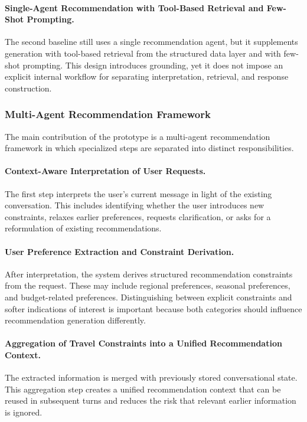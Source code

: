 \paragraph{Single-Agent Recommendation with Tool-Based Retrieval and Few-Shot Prompting.}
The second baseline still uses a single recommendation agent, but it supplements generation with tool-based retrieval from the structured data layer and with few-shot prompting. This design introduces grounding, yet it does not impose an explicit internal workflow for separating interpretation, retrieval, and response construction.

\subsubsection{Multi-Agent Recommendation Framework}\label{subsubsection:system-architecture:multi-agent-framework}
The main contribution of the prototype is a multi-agent recommendation framework in which specialized steps are separated into distinct responsibilities.

\paragraph{Context-Aware Interpretation of User Requests.}
The first step interprets the user's current message in light of the existing conversation. This includes identifying whether the user introduces new constraints, relaxes earlier preferences, requests clarification, or asks for a reformulation of existing recommendations.

\paragraph{User Preference Extraction and Constraint Derivation.}
After interpretation, the system derives structured recommendation constraints from the request. These may include regional preferences, seasonal preferences, and budget-related preferences. Distinguishing between explicit constraints and softer indications of interest is important because both categories should influence recommendation generation differently.

\paragraph{Aggregation of Travel Constraints into a Unified Recommendation Context.}
The extracted information is merged with previously stored conversational state. This aggregation step creates a unified recommendation context that can be reused in subsequent turns and reduces the risk that relevant earlier information is ignored.

